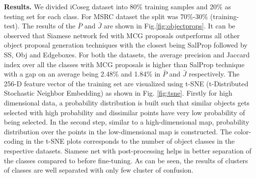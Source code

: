 \documentclass[conference]{IEEEtran}
\begin{document}
\textbf{Results.} We divided iCoseg dataset into 80\% training samples and 20\% as testing set for each class. For MSRC dataset the split was 70\%-30\% (training-test). The results of the $\bar{\textit{P}}$ and $\bar{\textit{J}}$ are shown in Fig.\ref{fig:objectprops}. It can be observed that  Siamese network fed with MCG proposals outperforms all other object proposal generation techniques with the closest being SalProp followed by SS, Obj and Edgeboxes. For both the datasets, the average precision and Jaccard index over all the classes with MCG proposals is higher than SalProp technique with a gap on an average being 2.48\% and 1.84\% in $\bar{\textit{P}}$ and $\bar{\textit{J}}$ respectively. The 256-D feature vector of the training set are visualized using t-SNE (t-Distributed Stochastic Neighbor Embedding) as shown in Fig. \ref{fig:tsne}. Firstly for high dimensional data, a probability distribution is built such that similar objects gets selected with high probability and dissimilar points have very low probability of being selected. In the second step, similar to a high-dimensional map, probability distribution over the points in the low-dimensional map is constructed. The color-coding in the t-SNE plots corresponds to the number of object classes in the respective datasets. Siamese net with post-processing helps in better separation of the classes compared to before fine-tuning. As can be seen, the results of clusters of classes are well separated with only few cluster of confusion. 
\end{document}
